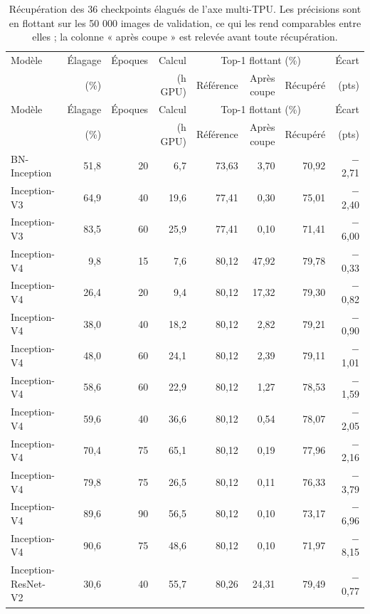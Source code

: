 {\footnotesize
\setlength{\tabcolsep}{4pt}
\begin{longtable}{@{}lrrrrrrr@{}}
\caption[Journal des entraînements de l'axe multi-TPU]{Récupération des 36 checkpoints élagués de l'axe multi-TPU. Les précisions sont en flottant sur les 50 000 images de validation, ce qui les rend comparables entre elles ; la colonne « après coupe » est relevée avant toute récupération.}\label{tab:ann_ft}\\
\toprule
Modèle & Élagage & Époques & Calcul & \multicolumn{3}{c}{Top-1 flottant (\%)} & Écart \\
\cmidrule(lr){5-7}
 & (\%) & & (h GPU) & Référence & Après coupe & Récupéré & (pts) \\
\midrule
\endfirsthead
\toprule
Modèle & Élagage & Époques & Calcul & \multicolumn{3}{c}{Top-1 flottant (\%)} & Écart \\
\cmidrule(lr){5-7}
 & (\%) & & (h GPU) & Référence & Après coupe & Récupéré & (pts) \\
\midrule
\endhead
\bottomrule
\endfoot
BN-Inception & 51,8 & 20 & 6,7 & 73,63 & 3,70 & 70,92 & $-$2,71 \\
\addlinespace[2pt]
Inception-V3 & 64,9 & 40 & 19,6 & 77,41 & 0,30 & 75,01 & $-$2,40 \\
Inception-V3 & 83,5 & 60 & 25,9 & 77,41 & 0,10 & 71,41 & $-$6,00 \\
\addlinespace[2pt]
Inception-V4 & 9,8 & 15 & 7,6 & 80,12 & 47,92 & 79,78 & $-$0,33 \\
Inception-V4 & 26,4 & 20 & 9,4 & 80,12 & 17,32 & 79,30 & $-$0,82 \\
Inception-V4 & 38,0 & 40 & 18,2 & 80,12 & 2,82 & 79,21 & $-$0,90 \\
Inception-V4 & 48,0 & 60 & 24,1 & 80,12 & 2,39 & 79,11 & $-$1,01 \\
Inception-V4 & 58,6 & 60 & 22,9 & 80,12 & 1,27 & 78,53 & $-$1,59 \\
Inception-V4 & 59,6 & 40 & 36,6 & 80,12 & 0,54 & 78,07 & $-$2,05 \\
Inception-V4 & 70,4 & 75 & 65,1 & 80,12 & 0,19 & 77,96 & $-$2,16 \\
Inception-V4 & 79,8 & 75 & 26,5 & 80,12 & 0,11 & 76,33 & $-$3,79 \\
Inception-V4 & 89,6 & 90 & 56,5 & 80,12 & 0,10 & 73,17 & $-$6,96 \\
Inception-V4 & 90,6 & 75 & 48,6 & 80,12 & 0,10 & 71,97 & $-$8,15 \\
\addlinespace[2pt]
Inception-ResNet-V2 & 30,6 & 40 & 55,7 & 80,26 & 24,31 & 79,49 & $-$0,77 \\

\end{longtable}}
